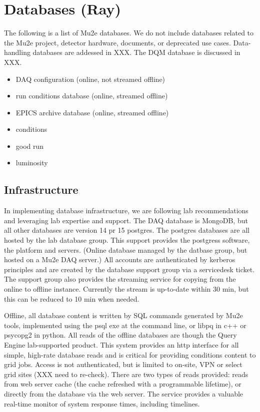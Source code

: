 \section{Databases (Ray)}
\label{sec:databases}
\label{database}
The following is a list of Mu2e databases.
We do not include databases related to the Mu2e project, detector hardware, documents, or deprecated use cases. Data-handling databases are addessed in XXX.  The DQM database is discussed in XXX.

\begin{itemize}
  \item DAQ configuration (online, not streamed offline)
  \item run conditions database (online, streamed offline)
  \item EPICS archive database (online, streamed offline)
  \item conditions
  \item good run
  \item luminosity
\end{itemize}

\subsection{Infrastructure} \label{database-infrastructure}
In implementing database infrastructure, we are following lab recommendations and leveraging lab expertise and support.  The DAQ database is MongoDB, but all other databases are version 14 pr 15 postgres.  The postgres databases are all hosted by the lab database group.  This support provides the postgress software, the platform and servers. (Online database managed by the datbase group, but hosted on a Mu2e DAQ server.) All accounts are authenticated by kerberos principles and are created by the database support group via a servicedesk ticket.  The support group also provides the streaming service for copying from the online to offline instance.  Currently the stream is up-to-date within 30 min, but this can be reduced to 10 min when needed.

Offline, all database content is written by SQL commands generated by Mu2e tools, implemented using the psql exe at the command line, or libpq in c++ or psycopg2 in python.  All reads of the offline databases are though the Query Engine lab-supported product.  This system provides an http interface for all simple, high-rate database reads and is critical for providing conditions content to grid jobs.  Access is not authenticated, but is limited to on-site, VPN or select grid sites (XXX need to re-check).  There are two types of reads provided: reads from web server cache (the cache refreshed with a programmable lifetime), or directly from the database via the web server.  The service provides a valuable real-time monitor of system response times, including timelines.

